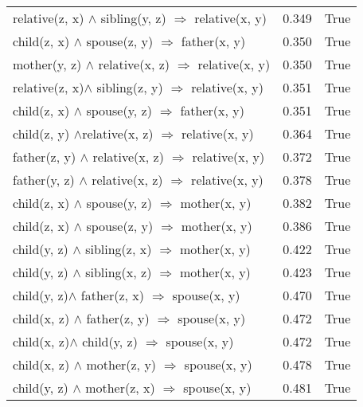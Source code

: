 \begin{longtable}{lrl}
 relative(z, x) $\wedge$ sibling(y, z)   $\Rightarrow$ relative(x, y) &           0.349 &                     True \\
       child(z, x) $\wedge$ spouse(z, y)   $\Rightarrow$ father(x, y) &           0.350 &                     True \\
  mother(y, z) $\wedge$ relative(x, z)   $\Rightarrow$ relative(x, y) &           0.350 &                     True \\
 relative(z, x)$\wedge$  sibling(z, y)   $\Rightarrow$ relative(x, y) &           0.351 &                     True \\
       child(z, x) $\wedge$ spouse(y, z)   $\Rightarrow$ father(x, y) &           0.351 &                     True \\
   child(z, y)  $\wedge$relative(x, z)   $\Rightarrow$ relative(x, y) &           0.364 &                     True \\
  father(z, y) $\wedge$ relative(x, z)   $\Rightarrow$ relative(x, y) &           0.372 &                     True \\
  father(y, z) $\wedge$ relative(x, z)   $\Rightarrow$ relative(x, y) &           0.378 &                     True \\
       child(z, x) $\wedge$ spouse(y, z)   $\Rightarrow$ mother(x, y) &           0.382 &                     True \\
       child(z, x) $\wedge$ spouse(z, y)   $\Rightarrow$ mother(x, y) &           0.386 &                     True \\
      child(y, z) $\wedge$ sibling(z, x)   $\Rightarrow$ mother(x, y) &           0.422 &                     True \\
      child(y, z) $\wedge$ sibling(x, z)   $\Rightarrow$ mother(x, y) &           0.423 &                     True \\
       child(y, z)$\wedge$  father(z, x)   $\Rightarrow$ spouse(x, y) &           0.470 &                     True \\
       child(x, z) $\wedge$ father(z, y)   $\Rightarrow$ spouse(x, y) &           0.472 &                     True \\
        child(x, z)$\wedge$  child(y, z)   $\Rightarrow$ spouse(x, y) &           0.472 &                     True \\
       child(x, z) $\wedge$ mother(z, y)   $\Rightarrow$ spouse(x, y) &           0.478 &                     True \\
       child(y, z) $\wedge$ mother(z, x)   $\Rightarrow$ spouse(x, y) &           0.481 &                     True \\

\end{longtable}
